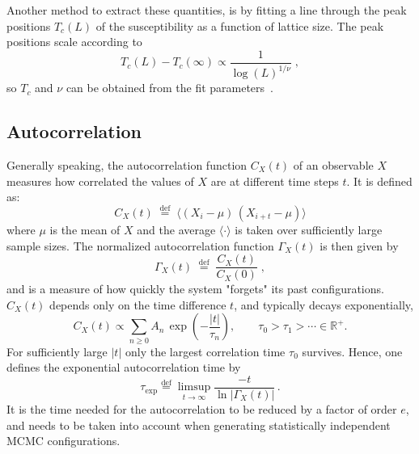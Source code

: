 Another method to extract these quantities, is by fitting a line through the peak positions $T_c(L)$ of the susceptibility as a function of lattice size.
The peak positions scale according to 
\begin{equation}
  T_c(L) - T_c(\infty) \propto \frac{1}{\log (L)^{1/\nu}} \;,
  \label{eq:bkt_scaling}
\end{equation}
so $T_c$ and $\nu$ can be obtained from the fit parameters~\cite{Sale2021}.

\subsection{Autocorrelation}
Generally speaking, the autocorrelation function $C_X(t)$ of an observable $X$ measures how correlated the values of $X$ are at different time steps $t$.
It is defined as:
\begin{equation}
  C_X(t)\;\stackrel{\mathrm{def}}{=}\;\big\langle (X_i-\mu)\,(X_{i+t}-\mu)\big\rangle
\end{equation}
where $\mu$ is the mean of $X$ and the average $\langle \cdot \rangle$ is taken over sufficiently large sample sizes.
The normalized autocorrelation function $\Gamma_X(t)$ is then given by
\begin{equation}
  \Gamma_X(t)\;\stackrel{\mathrm{def}}{=}\;\frac{C_X(t)}{C_X(0)} \;,
  \label{eq:Autocorrelation_Function}
\end{equation}
and is a measure of how quickly the system "forgets" its past configurations.
$C_X(t)$ depends only on the time difference $t$, and typically decays exponentially,
\begin{equation}
  C_X(t)\propto \sum_{n\ge 0} A_n\,\exp\!\left(-\frac{|t|}{\tau_n}\right),
  \qquad \tau_0>\tau_1>\cdots \in \mathbb{R}^+ .
\end{equation}
For sufficiently large $|t|$ only the largest correlation time $\tau_0$ survives.
Hence, one defines the exponential autocorrelation time by
\begin{equation}
  \tau_{\exp}\stackrel{\mathrm{def}}{=}\limsup_{t\to\infty}\frac{-t}{\ln\!\bigl|\Gamma_X(t)\bigr|}\,.
  \label{eq:Autocorrelation_Time}
\end{equation}
It is the time needed for the autocorrelation to be reduced by a factor of order $e$, and needs to be taken into account when generating statistically independent MCMC configurations.~\cite{PetschliesUrbach2026}